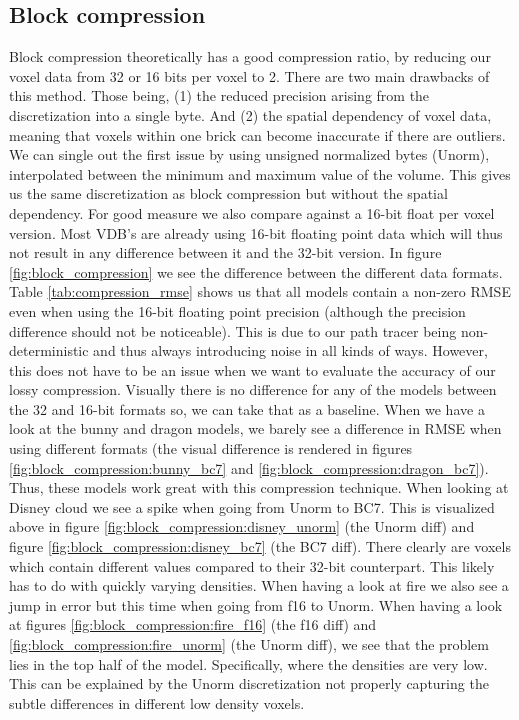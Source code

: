 \subsection{Block compression} \label{results:block_compression}
Block compression theoretically has a good compression ratio, by reducing our voxel data from 32 or 16 bits per voxel to 2. There are two main drawbacks of this method. Those being, (1) the reduced precision arising from the discretization into a single byte. And (2) the spatial dependency of voxel data, meaning that voxels within one brick can become inaccurate if there are outliers. We can single out the first issue by using unsigned normalized bytes (Unorm), interpolated between the minimum and maximum value of the volume. This gives us the same discretization as block compression but without the spatial dependency. For good measure we also compare against a 16-bit float per voxel version. Most VDB's are already using 16-bit floating point data which will thus not result in any difference between it and the 32-bit version. In figure \ref{fig:block_compression} we see the difference between the different data formats. Table \ref{tab:compression_rmse} shows us that all models contain a non-zero RMSE even when using the 16-bit floating point precision (although the precision difference should not be noticeable). This is due to our path tracer being non-deterministic and thus always introducing noise in all kinds of ways. However, this does not have to be an issue when we want to evaluate the accuracy of our lossy compression. Visually there is no difference for any of the models between the 32 and 16-bit formats so, we can take that as a baseline. When we have a look at the bunny and dragon models, we barely see a difference in RMSE when using different formats (the visual difference is rendered in figures \ref{fig:block_compression:bunny_bc7} and \ref{fig:block_compression:dragon_bc7}). Thus, these models work great with this compression technique. When looking at Disney cloud we see a spike when going from Unorm to BC7. This is visualized above in figure \ref{fig:block_compression:disney_unorm} (the Unorm diff) and figure \ref{fig:block_compression:disney_bc7} (the BC7 diff). There clearly are voxels which contain different values compared to their 32-bit counterpart. This likely has to do with quickly varying densities. When having a look at fire we also see a jump in error but this time when going from f16 to Unorm. When having a look at figures \ref{fig:block_compression:fire_f16} (the f16 diff) and \ref{fig:block_compression:fire_unorm} (the Unorm diff), we see that the problem lies in the top half of the model. Specifically, where the densities are very low. This can be explained by the Unorm discretization not properly capturing the subtle differences in different low density voxels. 



